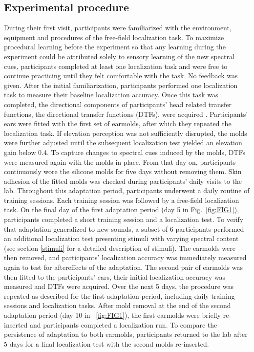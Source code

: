 \documentclass[preprint]{JASA}
\begin{document}
\subsection{Experimental procedure}
During their first visit, participants were familiarized with the environment, equipment and procedures of the free-field localization task. To maximize procedural learning before the experiment so that any learning during the experiment could be attributed solely to sensory learning of the new spectral cues, participants completed at least one localization task and were free to continue practicing until they felt comfortable with the task. No feedback was given. After the initial familiarization, participants performed one localization task to measure their baseline localization accuracy. Once this task was completed, the directional components of participants' head related transfer functions, the directional transfer functions (DTFs), were acquired \citep{middlebrooks_individual_1999}. Participants’ ears were fitted with the first set of earmolds, after which they repeated the localization task. If elevation perception was not sufficiently disrupted, the molds were further adjusted until the subsequent localization test yielded an elevation gain below 0.4. To capture changes to spectral cues induced by the molds, DTFs were measured again with the molds in place. From that day on, participants continuously wore the silicone molds for five days without removing them. Skin adhesion of the fitted molds was checked during participants' daily visits to the lab. Throughout this adaptation period, participants underwent a daily routine of training sessions. Each training session was followed by a free-field localization task. On the final day of the first adaptation period (day 5 in Fig.~\ref{fig:FIG1}), participants completed a short training session and a localization test. To verify that adaptation generalized to new sounds, a subset of 6 participants performed an additional localization test presenting stimuli with varying spectral content (see section \ref{stimuli} for a detailed description of stimuli). The earmolds were then removed, and participants’ localization accuracy was immediately measured again to test for aftereffects of the adaptation. The second pair of earmolds was then fitted to the participants’ ears, their initial localization accuracy was measured and DTFs were acquired. Over the next 5 days, the procedure was repeated as described for the first adaptation period, including daily training sessions and localization tasks. After mold removal at the end of the second adaptation period (day 10 in ~\ref{fig:FIG1}), the first earmolds were briefly re-inserted and participants completed a localization run. To compare the persistence of adaptation to both earmolds, participants returned to the lab after 5 days for a final localization test with the second molds re-inserted. 
\end{document}
